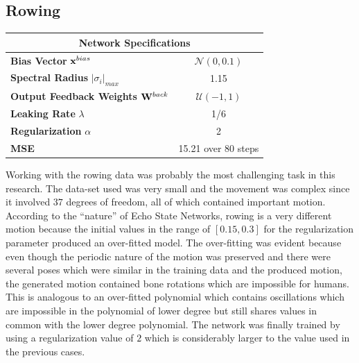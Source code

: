 \documentclass[letterpaper,9pt]{article}
\newcommand{\networkSpecs}[6]{
  \begin{center}
  \begin{tabular}{ | l | c | }
    \hline
    \multicolumn{2}{|c|}{{\bf Network Specifications}} \\
    \hline
    {\bf Bias Vector} ${\bf x}^{bias}$ & $\mathcal{N}(#1)$ \\
    \hline
    {\bf Spectral Radius} $|\sigma_i|_{max}$ & #2 \\
    \hline
    {\bf Output Feedback Weights} ${\bf W}^{back}$ & $\mathcal{U}(#3)$ \\
    \hline
    {\bf Leaking Rate} $\lambda$ & #4 \\
    \hline
    {\bf Regularization} $\alpha$ & #5\\
    \hline
    {\bf MSE} & #6\\
    \hline
  \end{tabular}    
  \end{center}
}
\begin{document}
\subsection{Rowing}

\networkSpecs{0,0.1}
             {1.15}
             {-1,1}
             {1/6}
             {2}
             {15.21 over 80 steps}

Working with the rowing data was probably the most challenging task in this research. The data-set used was very small and the movement was complex since it involved $37$ degrees of freedom, all of which contained important motion. \\

According to the ``nature'' of Echo State Networks, rowing is a very different motion because the initial values in the range of $[0.15,0.3]$ for the regularization parameter produced an over-fitted model. The over-fitting was evident because even though the periodic nature of the motion was preserved and there were several poses which were similar in the training data and the produced motion, the generated motion contained bone rotations which are impossible for humans. This is analogous to an over-fitted polynomial which contains oscillations which are impossible in the polynomial of lower degree but still shares values in common with the lower degree polynomial. The network was finally trained by using a regularization value of $2$ which is considerably larger to the value used in the previous cases.\pagebreak
\end{document}

